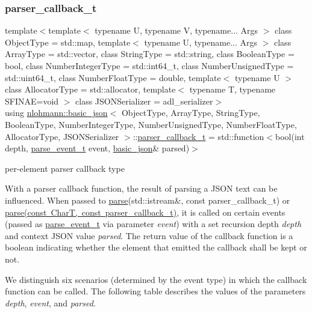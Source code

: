 \subsubsection{\texorpdfstring{parser\_callback\_t}{parser\_callback\_t}}
{\footnotesize\ttfamily template$<$template$<$ typename U, typename V, typename... Args $>$ class Object\+Type = std\+::map, template$<$ typename U, typename... Args $>$ class Array\+Type = std\+::vector, class String\+Type  = std\+::string, class Boolean\+Type  = bool, class Number\+Integer\+Type  = std\+::int64\+\_\+t, class Number\+Unsigned\+Type  = std\+::uint64\+\_\+t, class Number\+Float\+Type  = double, template$<$ typename U $>$ class Allocator\+Type = std\+::allocator, template$<$ typename T, typename S\+F\+I\+N\+A\+E=void $>$ class J\+S\+O\+N\+Serializer = adl\+\_\+serializer$>$ \\
using \mbox{\hyperlink{classnlohmann_1_1basic__json}{nlohmann\+::basic\+\_\+json}}$<$ Object\+Type, Array\+Type, String\+Type, Boolean\+Type, Number\+Integer\+Type, Number\+Unsigned\+Type, Number\+Float\+Type, Allocator\+Type, J\+S\+O\+N\+Serializer $>$\+::\mbox{\hyperlink{classnlohmann_1_1basic__json_aecae491e175f8767c550ae3c59e180e3}{parser\+\_\+callback\+\_\+t}} =  std\+::function$<$bool(int depth, \mbox{\hyperlink{classnlohmann_1_1basic__json_aea1c863b719b4ca5b77188c171bbfafe}{parse\+\_\+event\+\_\+t}} event, \mbox{\hyperlink{classnlohmann_1_1basic__json}{basic\+\_\+json}}\& parsed)$>$}



per-\/element parser callback type 

With a parser callback function, the result of parsing a J\+S\+ON text can be influenced. When passed to \mbox{\hyperlink{classnlohmann_1_1basic__json_a86f339e8449cce96b89e86635a7d389e}{parse}}(std\+::istream\&, const parser\+\_\+callback\+\_\+t) or \mbox{\hyperlink{classnlohmann_1_1basic__json_ab275a3e00a40189e96d244de6c8f311a}{parse(const Char\+T, const parser\+\_\+callback\+\_\+t)}}, it is called on certain events (passed as \mbox{\hyperlink{classnlohmann_1_1basic__json_aea1c863b719b4ca5b77188c171bbfafe}{parse\+\_\+event\+\_\+t}} via parameter {\itshape event}) with a set recursion depth {\itshape depth} and context J\+S\+ON value {\itshape parsed}. The return value of the callback function is a boolean indicating whether the element that emitted the callback shall be kept or not.

We distinguish six scenarios (determined by the event type) in which the callback function can be called. The following table describes the values of the parameters {\itshape depth}, {\itshape event}, and {\itshape parsed}.

